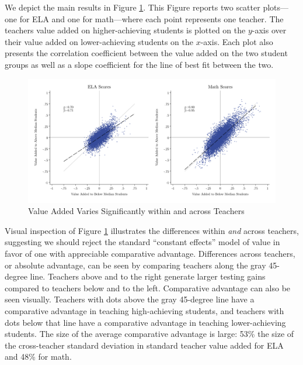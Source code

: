 \documentclass[12pt]{article}
\theoremstyle{definition}
\theoremstyle{definition}
\theoremstyle{definition}
\theoremstyle{definition}
\begin{document}
We depict the main results in Figure \ref{fig:va_est}. This Figure reports two scatter plots---one for ELA and one for math---where each point represents one teacher. The teachers value added on higher-achieving students is plotted on the $y$-axis over their value added on lower-achieving students on the $x$-axis. Each plot also presents the correlation coefficient between the value added on the two student groups as well as a slope coefficient for the line of best fit between the two. %



\begin{figure}[htpb]
\centering
\includegraphics[width=.9\textwidth]{Working_Paper/test_figures/02a_VA.pdf}
    \caption{Value Added Varies Significantly within and across Teachers}
    \label{fig:va_est}
\end{figure}

Visual inspection of Figure \ref{fig:va_est} illustrates the differences within \textit{and} across teachers, suggesting we should reject the standard ``constant effects'' model of value in favor of one with appreciable comparative advantage. Differences across teachers, or absolute advantage, can be seen by comparing teachers along the gray 45-degree line. Teachers above and to the right generate larger testing gains compared to teachers below and to the left. Comparative advantage can also be seen visually. Teachers with dots above the gray 45-degree line have a comparative advantage in teaching high-achieving students, and teachers with dots below that line have a comparative advantage in teaching lower-achieving students. The size of the average comparative advantage is large: 53\% the size of the cross-teacher standard deviation in standard teacher value added for ELA and 48\% for math.  %
\end{document}
